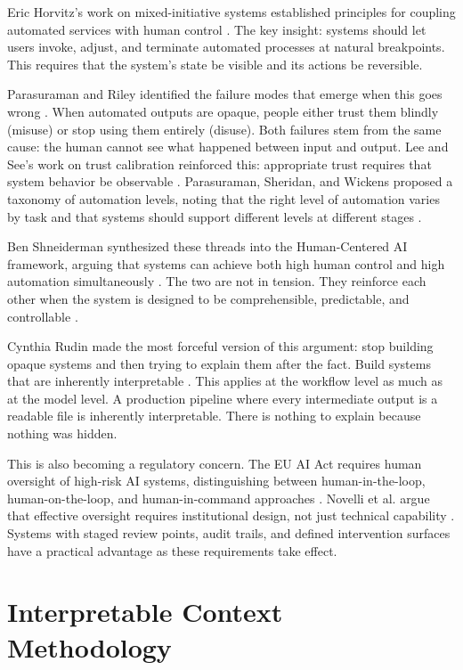 \documentclass[acmlarge,nonacm,screen]{acmart}
\begin{document}
Eric Horvitz's work on mixed-initiative systems established principles for coupling automated services with human control \cite{horvitz1999}. The key insight: systems should let users invoke, adjust, and terminate automated processes at natural breakpoints. This requires that the system's state be visible and its actions be reversible.

Parasuraman and Riley identified the failure modes that emerge when this goes wrong \cite{parasuraman1997}. When automated outputs are opaque, people either trust them blindly (misuse) or stop using them entirely (disuse). Both failures stem from the same cause: the human cannot see what happened between input and output. Lee and See's work on trust calibration reinforced this: appropriate trust requires that system behavior be observable \cite{lee2004}. Parasuraman, Sheridan, and Wickens proposed a taxonomy of automation levels, noting that the right level of automation varies by task and that systems should support different levels at different stages \cite{parasuraman2000}.

Ben Shneiderman synthesized these threads into the Human-Centered AI framework, arguing that systems can achieve both high human control and high automation simultaneously \cite{shneiderman2020}. The two are not in tension. They reinforce each other when the system is designed to be comprehensible, predictable, and controllable \cite{shneiderman2022}.

Cynthia Rudin made the most forceful version of this argument: stop building opaque systems and then trying to explain them after the fact. Build systems that are inherently interpretable \cite{rudin2019}. This applies at the workflow level as much as at the model level. A production pipeline where every intermediate output is a readable file is inherently interpretable. There is nothing to explain because nothing was hidden.

This is also becoming a regulatory concern. The EU AI Act requires human oversight of high-risk AI systems, distinguishing between human-in-the-loop, human-on-the-loop, and human-in-command approaches \cite{enqvist2023}. Novelli et al. argue that effective oversight requires institutional design, not just technical capability \cite{novelli2024}. Systems with staged review points, audit trails, and defined intervention surfaces have a practical advantage as these requirements take effect.

\section{Interpretable Context Methodology}
\end{document}
